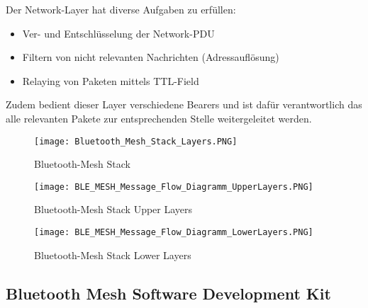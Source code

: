 Der Network-Layer hat diverse Aufgaben zu erfüllen: 

\begin{itemize}
	\item Ver- und Entschlüsselung der Network-PDU
	\item Filtern von nicht relevanten Nachrichten (Adressauflösung)
	\item Relaying von Paketen mittels TTL-Field
\end{itemize}

Zudem bedient dieser Layer verschiedene Bearers und ist dafür verantwortlich das alle relevanten Pakete zur entsprechenden Stelle weitergeleitet werden. 


\begin{figure} [H]
	\centering
	\texttt{[image: Bluetooth\_Mesh\_Stack\_Layers.PNG]}
	\caption{Bluetooth-Mesh Stack \cite{bluetooth_sig_mesh-technology-overviewpdf_2020}} 
	\label{fig:BTMeshStack}
\end{figure}

\begin{figure} [H]
	\centering
	\texttt{[image: BLE\_MESH\_Message\_Flow\_Diagramm\_UpperLayers.PNG]}
	\caption{Bluetooth-Mesh Stack Upper Layers \cite{bluetooth_sig_mesh_netzwerk_spezifikationen_2020}} 
	\label{fig:BTMeshStackUpperLayers}
\end{figure}

\begin{figure} [H]
	\centering
	\texttt{[image: BLE\_MESH\_Message\_Flow\_Diagramm\_LowerLayers.PNG]}
	\caption{Bluetooth-Mesh Stack Lower Layers \cite{bluetooth_sig_mesh_netzwerk_spezifikationen_2020}} 
	\label{fig:BTMeshStackLowerLayers}
\end{figure}


\subsection{Bluetooth Mesh Software Development Kit}\label{sec:ZigbeeSoftwareDevelopmentKit}


